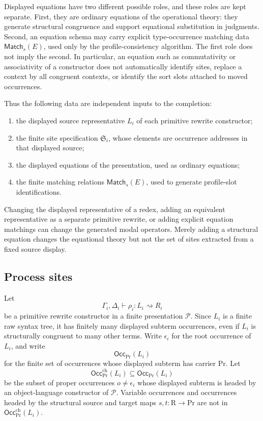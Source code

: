 \documentclass[11pt]{article}
\newcommand{\Proc}{\mathrm{Pr}}
\newcommand{\Rew}{\mathrm{R}}
\newcommand{\rw}{\rightsquigarrow}
\newcommand{\Occ}{\mathsf{Occ}}
\newcommand{\Match}{\mathsf{Match}}
\begin{document}
Displayed equations have two different possible roles, and these roles are kept separate.  First, they are ordinary equations of the operational theory: they generate structural congruence and support equational substitution in judgments.  Second, an equation schema may carry explicit type-occurrence matching data \(\Match_s(E)\), used only by the profile-consistency algorithm.  The first role does not imply the second.  In particular, an equation such as commutativity or associativity of a constructor does not automatically identify sites, replace a context by all congruent contexts, or identify the sort slots attached to moved occurrences.

Thus the following data are independent inputs to the completion:
\begin{enumerate}[label=\textup{(\alph*)}]
  \item the displayed source representative \(L_i\) of each primitive rewrite constructor;
  \item the finite site specification \(\mathfrak S_i\), whose elements are occurrence addresses in that displayed source;
  \item the displayed equations of the presentation, used as ordinary equations;
  \item the finite matching relations \(\Match_s(E)\), used to generate profile-slot identifications.
\end{enumerate}
Changing the displayed representative of a redex, adding an equivalent representative as a separate primitive rewrite, or adding explicit equation matchings can change the generated modal operators.  Merely adding a structural equation changes the equational theory but not the set of sites extracted from a fixed source display.


\subsection{Process sites}

Let
\[
  \Gamma_i,\Delta_i\vdash \rho_i:L_i\rw R_i
\]
be a primitive rewrite constructor in a finite presentation \(\mathcal{P}\). Since
\(L_i\) is a finite raw syntax tree, it has finitely many displayed subterm
occurrences, even if \(L_i\) is structurally congruent to many other terms.  Write \(\epsilon_i\) for the root occurrence of \(L_i\), and write
\[
  \Occ_{\Proc}(L_i)
\]
for the finite set of occurrences whose displayed subterm has carrier \(\Proc\).
Let
\[
  \Occ^{\mathrm{ch}}_{\Proc}(L_i)
  \subseteq
  \Occ_{\Proc}(L_i)
\]
be the subset of proper occurrences \(o\ne\epsilon_i\) whose displayed subterm
is headed by an object-language constructor of \(\mathcal{P}\).  Variable
occurrences and occurrences headed by the structural source and target maps
\(s,t:\Rew\to\Proc\) are not in \(\Occ^{\mathrm{ch}}_{\Proc}(L_i)\).
\end{document}
